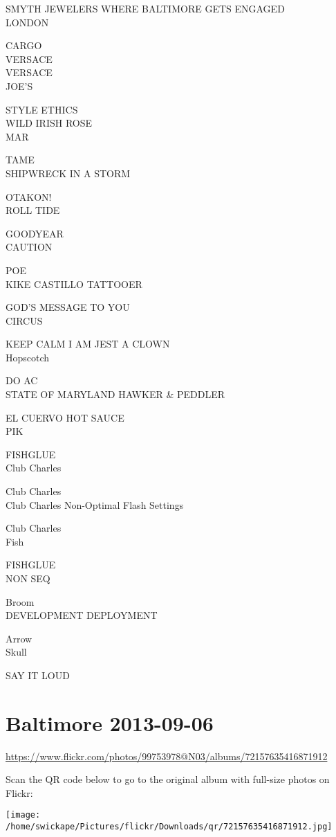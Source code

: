 \documentclass[10pt,letterpaper]{article}
\begin{document}
SMYTH JEWELERS WHERE BALTIMORE GETS ENGAGED\\
LONDON

CARGO\\
VERSACE\\
VERSACE\\
JOE'S

STYLE ETHICS\\
WILD IRISH ROSE\\
MAR

TAME\\
SHIPWRECK IN A STORM

OTAKON!\\
ROLL TIDE

GOODYEAR\\
CAUTION

POE\\
KIKE CASTILLO TATTOOER

GOD'S MESSAGE TO YOU\\
CIRCUS

KEEP CALM I AM JEST A CLOWN\\
Hopscotch

DO AC\\
STATE OF MARYLAND HAWKER \& PEDDLER

EL CUERVO HOT SAUCE\\
PIK

FISHGLUE\\
Club Charles

Club Charles\\
Club Charles Non{-}Optimal Flash Settings

Club Charles\\
Fish

FISHGLUE\\
NON SEQ

Broom\\
DEVELOPMENT DEPLOYMENT

Arrow\\
Skull

SAY IT LOUD
\pagebreak

\section*{Baltimore 2013-09-06}

\url{https://www.flickr.com/photos/99753978@N03/albums/72157635416871912}

Scan the QR code below to go to the original album with full-size photos on Flickr:

\texttt{[image: /home/swickape/Pictures/flickr/Downloads/qr/72157635416871912.jpg]}
\pagebreak
\end{document}
